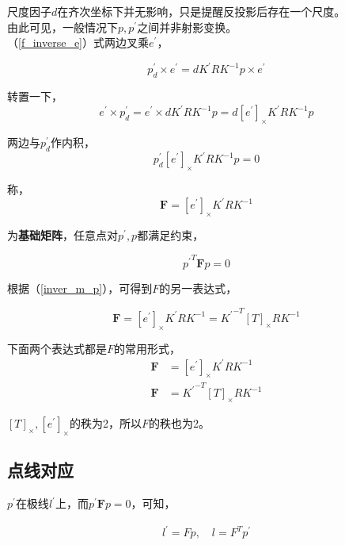 		尺度因子$d$在齐次坐标下并无影响，只是提醒反投影后存在一个尺度。\\

		由此可见，一般情况下$p,p^\prime$之间并非射影变换。\\

		（\ref{f_inverse_e}）式两边叉乘$e^\prime$，

		$$
			p^{\prime}_d\times e^\prime = dK^{\prime}RK^{-1}p \times e^\prime
		$$

		转置一下，
		$$
			e^\prime \times p^{\prime}_d = e^\prime \times dK^{\prime}RK^{-1}p = d[e^\prime]_{\times}K^{\prime}RK^{-1}p
		$$

		两边与$p^\prime_d$作内积，
		$$
			p^\prime_d [e^\prime]_{\times}K^{\prime}RK^{-1}p = 0
		$$

		称，
		\begin{equation*}
			\mathbf{F} = [e^\prime]_{\times}K^{\prime}RK^{-1}
		\end{equation*}

		为\textbf{基础矩阵}，任意点对$p^\prime,p$都满足约束，

		\begin{equation}
			{p^{\prime}}^T \mathbf{F} p = 0 \label{f_constrain}
		\end{equation}

		根据（\ref{inver_m_p}），可得到$F$的另一表达式，

		$$
			\mathbf{F} = [e^\prime]_{\times}K^{\prime}RK^{-1} = {K^{\prime}}^{-T}[T]_{\times}RK^{-1}
		$$

		下面两个表达式都是$F$的常用形式，
		\begin{align}
			\mathbf{F} &= [e^\prime]_{\times}K^{\prime}RK^{-1} \label{f_1}\\
			\mathbf{F} &= {K^{\prime}}^{-T}[T]_{\times}RK^{-1} \label{f_1}
		\end{align}

		$[T]_{\times},[e^\prime]_{\times}$的秩为2，所以$F$的秩也为2。\\

	\subsection*{点线对应}

		$p^{\prime}$在极线$l^{\prime}$上，而$p^\prime \mathbf{F} p=0$，可知，

	\begin{align*}
		l^{\prime} = Fp,\quad 
		l = F^Tp^\prime
	\end{align*}

